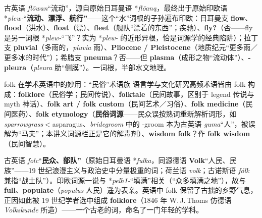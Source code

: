 \documentclass[../main.tex]{subfiles}
\begin{document}
\begin{origin}
古英语 \textit{flōwan}“流动”，源自原始日耳曼语 *\textit{flōaną}，最终出于原始印欧语 *\textit{plew-}“\textbf{流动、漂浮、航行”}——这个“水”词根的子孙遍布印欧：日耳曼支 \textbf{flow}、\textbf{flood}（洪水）、\textbf{float}（漂）、\textbf{fleet}（舰队“漂着的东西”；疾驰）、\textbf{fly?}（否——fly 是另一词根 *\textit{plew-}“飞”？实为 *\textit{plew-} 的近形异根，恰是词源学的经典陷阱）；拉丁支 \textbf{pluvial}（多雨的，\textit{pluvia} 雨）、\textbf{Pliocene / Pleistocene}（地质纪元“更多雨／更多冰的时代”）；希腊支 \textbf{pneuma}？否——但 \textbf{plasma}（成形之物“流动体”）、\textbf{-pleura}（\textit{pleura} 肋“侧膜”）。一词根，半部水文地理。
\end{origin}





\begin{gram}{folk 在学术英语中的妙用：“民俗”术语族}
语言学与文化研究高频术语皆由 folk 构成：\textbf{folklore}（民俗学；民间传说）、\textbf{folktale}（民间故事，区别于 legend 传说与 myth 神话）、\textbf{folk art / folk custom}（民间艺术／习俗）、\textbf{folk medicine}（民间医药）、\textbf{folk etymology}（\textbf{民俗词源}——民众误按熟词重新解析词形，如 \textit{sparrowgrass}$<$asparagus、\textit{bridegroom} 中的 -groom 本为古英语 \textit{guma}“人”，被误解为“马夫”；本讲义词源栏正是它的解毒剂）、\textbf{wisdom folk}？作 \textbf{folk wisdom}（民间智慧）。
\end{gram}

\begin{origin}
古英语 \textit{folc}“\textbf{民众、部队”}（原始日耳曼语 *\textit{fulka}，同源德语 \textbf{Volk}“人民、民族”——19 世纪浪漫主义与政治史中分量极重的词；荷兰语 \textit{volk}；古诺斯语 \textit{fólk} 兼指“战士队”）。印欧词源一说与 *\textit{pelh\u{1}-}“填满”相关（“众多填满之地”），故与 \textbf{full}、\textbf{populate}（\textit{populus} 人民）遥为表亲。英语中 folk 保留了古拙的乡野气息，正因如此被 19 世纪学者选中组成 \textbf{folklore}（1846 年 W.\,J.\,Thoms 仿德语 \textit{Volkskunde} 所造）——一个古老的词，命名了一门年轻的学科。
\end{origin}
\end{document}
